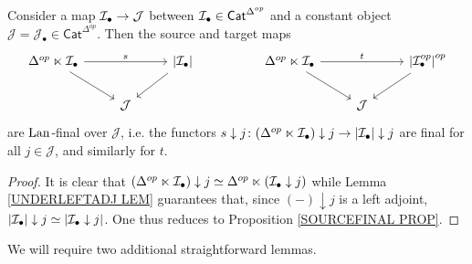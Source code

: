 \documentclass[a4paper,10pt]{article}%
\begin{document}

\begin{corollary}\label{SOURCELANFINAL COR}
	Consider a map
	$\mathcal{I}_{\bullet} \to \mathcal{J}$
	between $\mathcal{I}_{\bullet} \in \mathsf{Cat}^{\Delta^{op}}$
	and a constant object
	$\mathcal{J} = \mathcal{J}_{\bullet} \in \mathsf{Cat}^{\Delta^{op}}$. Then the source and target maps 
\[
	\begin{tikzcd}
	\Delta^{op} \ltimes \mcI_{\bullet} \ar{rr}{s}  \ar{rd}&& \left|\mcI_{\bullet} \right|\ar{dl}
& &
	\Delta^{op} \ltimes \mcI_{\bullet} \ar{rr}{t}  \ar{rd}&& \left|\mcI_{\bullet}^{op} \right|^{op}\ar{dl}
\\
	& \mathcal{J} &
& &
	& \mathcal{J} &
	\end{tikzcd}	
\]
are $\operatorname{Lan}$-final over $\mathcal{J}$, i.e. the functors 
$s \downarrow j \colon (\Delta^{op} \ltimes \mathcal{I}_{\bullet})\downarrow j \to |\mathcal{I}_{\bullet}|\downarrow j$ are final for all $j\in \mathcal{J}$,
and similarly for $t$.
\end{corollary}

\begin{proof}
It is clear that $(\Delta^{op} \ltimes \mathcal{I}_{\bullet})\downarrow j \simeq \Delta^{op} \ltimes ( \mathcal{I}_{\bullet}\downarrow j)$
while Lemma \ref{UNDERLEFTADJ LEM}
guarantees that, since $(\minus) \downarrow j$ is a left adjoint, $|\mathcal{I}_{\bullet}|\downarrow j \simeq |\mathcal{I}_{\bullet}\downarrow j |$. One thus reduces to Proposition \ref{SOURCEFINAL PROP}.
\end{proof}


We will require two additional straightforward lemmas.
\end{document}
